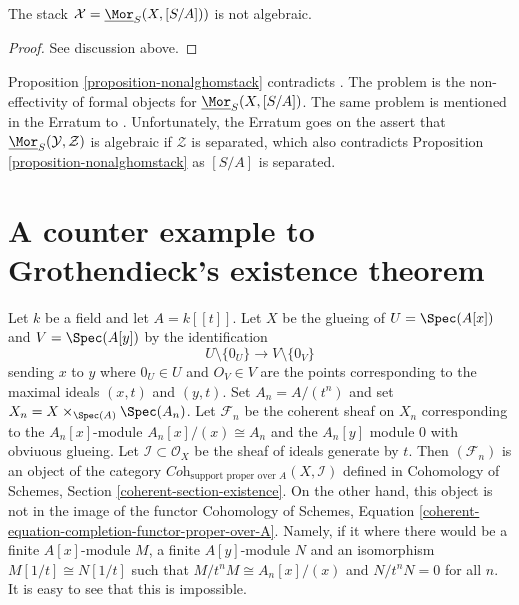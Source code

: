 \begin{proposition}
\label{proposition-nonalghomstack}
The stack $\mathcal{X} = \underline{\Mor}_S(X, [S/A]))$ is not algebraic.
\end{proposition}

\begin{proof}
See discussion above.
\end{proof}

\begin{remark}
\label{remark-contradict-aoki}
Proposition \ref{proposition-nonalghomstack} contradicts
\cite[Theorem 1.1]{AokiHomStacks}. The problem is the non-effectivity
of formal objects for $\underline{\Mor}_S(X, [S/A])$. The same problem
is mentioned in the Erratum \cite{AokiHomStacksErr} to
\cite{AokiHomStacks}. Unfortunately, the Erratum goes on
the assert that $\underline{\Mor}_S(\mathcal{Y}, \mathcal{Z})$
is algebraic if $\mathcal{Z}$ is separated, which also contradicts
Proposition \ref{proposition-nonalghomstack} as $[S/A]$ is separated.
\end{remark}







\section{A counter example to Grothendieck's existence theorem}
\label{section-Grothendieck-existence}

\noindent
Let $k$ be a field and let $A = k[[t]]$. Let $X$ be the glueing of
$U = \Spec(A[x])$ and $V = \Spec(A[y])$ by the identification
$$
U \setminus \{0_U\} \longrightarrow V \setminus \{0_V\}
$$
sending $x$ to $y$ where $0_U \in U$ and $O_V \in V$ are the points
corresponding to the maximal ideals $(x, t)$ and $(y, t)$. Set
$A_n = A/(t^n)$ and set $X_n = X \times_{\Spec(A)} \Spec(A_n)$.
Let $\mathcal{F}_n$ be the coherent sheaf on $X_n$
corresponding to the $A_n[x]$-module $A_n[x]/(x) \cong A_n$
and the $A_n[y]$ module $0$ with obviuous glueing.
Let $\mathcal{I} \subset \mathcal{O}_X$ be the sheaf of
ideals generate by $t$. Then $(\mathcal{F}_n)$ is an object of
the category $\textit{Coh}_{\text{support proper over } A}(X, \mathcal{I})$
defined in Cohomology of Schemes, Section \ref{coherent-section-existence}.
On the other hand, this object is not in the image of
the functor
Cohomology of Schemes,
Equation \ref{coherent-equation-completion-functor-proper-over-A}.
Namely, if it where there would be a finite $A[x]$-module $M$,
a finite $A[y]$-module $N$ and an isomorphism $M[1/t] \cong N[1/t]$
such that $M/t^nM \cong A_n[x]/(x)$ and $N/t^nN = 0$ for all $n$.
It is easy to see that this is impossible.

